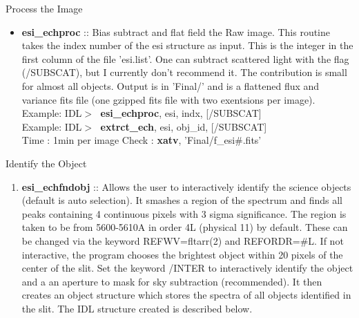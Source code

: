 \documentclass[11pt,letterpaper,dvips]{article}
\begin{document}
\begin{enumerate}

{\Large  \item Process the Image}

  \begin{itemize}
	\item {\bf esi\_echproc} :: Bias subtract and flat field the Raw image.
	This routine takes the index number of the esi structure as input.
	This is the integer in the first column of the file 'esi.list'.
	One can subtract scattered light with the flag (/SUBSCAT), but I
	currently don't recommend it.  The contribution is small for almost all
	objects.
	Output is in 'Final/' and is a flattened flux and variance fits file
	(one gzipped fits file with two exentsions per image). \\
         \quad Example: IDL$> \;$ {\bf esi\_echproc}, esi, indx, [/SUBSCAT]  \\
         \quad Example: IDL$> \;$ {\bf extrct\_ech}, esi, obj\_id, [/SUBSCAT] \\
         \quad Time   : 1min per image
         \quad Check  : {\bf xatv}, 'Final/f\_esi\#.fits'


  \end{itemize}

{\Large  \item Identify the Object}

  \begin{enumerate}
	\item {\bf esi\_echfndobj} :: Allows the user to interactively identify
	the science objects (default is auto selection).   It smashes a
	region of the spectrum and finds all peaks containing 4
	continuous pixels with 3 sigma significance.  The region is taken
	to be from 5600-5610A in order 4L (physical 11) by default.  These
	can be changed via the keyword REFWV=fltarr(2) and REFORDR=\#L.
	If not interactive, the program chooses the brightest object within
	20 pixels of the center of the slit.  Set the keyword /INTER to 
	interactively identify the object and a an aperture to mask for
	sky subtraction (recommended).
	It then creates an object structure which
	stores the spectra of all objects identified in the slit.
	The IDL structure created is described below.

\clearpage


\end{enumerate}
\end{enumerate}
\end{document}
